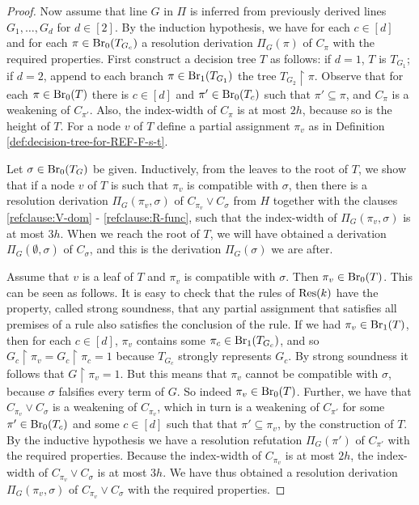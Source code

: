 \begin{proof}
Now assume that line $G$ in $\Pi$ is inferred from previously derived lines $G_1, \ldots, G_d$ for $d \in [2]$. By the induction hypothesis, we have for each $c \in [d]$ and for each  $\pi \in \textnormal{Br}_0(T_{G_c})$ a resolution derivation $\Pi_G(\pi)$ of $C_{\pi}$ with the required properties. First construct a decision tree $T$ as follows: if $d=1$, $T$ is $T_{G_1}$; if $d=2$, append to each branch $\pi \in \textnormal{Br}_1(T_{G_1})$ the tree $T_{G_2} \! \restriction \! \pi$. Observe that for each $\pi \in \textnormal{Br}_0(T)$ there is $c \in [d]$ and $\pi' \in \textnormal{Br}_0(T_c)$ such that $\pi' \subseteq \pi$, and  $C_{\pi}$ is a weakening of $C_{\pi'}$. Also, the index-width of $C_{\pi}$ is at most $2h$, because so is the height of $T$. 
For a node $v$ of $T$ define a partial assignment $\pi_v$ as in Definition \ref{def:decision-tree-for-REF-F-s-t}.

Let $\sigma \in \textnormal{Br}_0(T_G)$ be given. Inductively, from the leaves to the root of $T$, we show that if a node $v$ of $T$ is such that $\pi_v$ is compatible with $\sigma$, then there is a resolution derivation $\Pi_G(\pi_v, \sigma)$ of $C_{\pi_v} \lor C_{\sigma}$ from $H$ together with the clauses \eqref{refclause:V-dom} - \eqref{refclause:R-func}, such that the index-width of $\Pi_G(\pi_v, \sigma)$ is at most $3h$. When we reach the root of $T$, we will have obtained a derivation $\Pi_G(\emptyset, \sigma)$ of $C_{\sigma}$, and this is the derivation $\Pi_G(\sigma)$ we are after.

Assume that $v$ is a leaf of $T$ and $\pi_v$ is compatible with $\sigma$. Then $\pi_v \in \textnormal{Br}_0(T)$. This can be seen as follows. It is easy to check that the rules of $\textnormal{Res}(k)$ have the property, called strong soundness, that any partial assignment that satisfies all premises of a rule also satisfies the conclusion of the rule. If we had $\pi_v \in \textnormal{Br}_1(T)$, then for each $c \in [d]$, $\pi_v$ contains some $\pi_c \in \textnormal{Br}_1(T_{G_c})$, and so $G_c \! \restriction \! \pi_v = G_c \! \restriction \! \pi_c = 1$ because $T_{G_c}$ strongly represents $G_c$. By strong soundness it follows that $G \! \restriction \! \pi_v = 1$. But this means that $\pi_v$ cannot be compatible with $\sigma$, because $\sigma$ falsifies every term of $G$. So indeed $\pi_v \in \textnormal{Br}_0(T)$. Further, we have that $C_{\pi_v} \lor C_{\sigma}$ is a weakening of $C_{\pi_v}$, which in turn is a weakening of $C_{\pi'}$ for some $\pi' \in \textnormal{Br}_0(T_c)$ and some $c \in [d]$ such that that $\pi' \subseteq \pi_v$, by the construction of $T$. By the inductive hypothesis we have a resolution refutation $\Pi_G(\pi')$ of $C_{\pi'}$ with the required properties.  Because the index-width of $C_{\pi_v}$ is at most $2h$, the index-width of $C_{\pi_v} \lor C_{\sigma}$ is at most $3h$. We have thus obtained a resolution derivation $\Pi_G(\pi_v, \sigma)$ of $C_{\pi_v} \lor C_{\sigma}$ with the required properties.


\end{proof}
